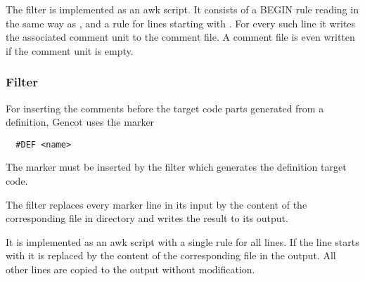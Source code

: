 The filter is implemented as an awk script. It consists of a 
BEGIN rule reading  in the same way as , and a rule for lines starting with 
. For every such line it writes the associated comment unit to the comment file. A comment
file is even written if the comment unit is empty.

\subsubsection{Filter }

For inserting the comments before the target code parts generated from a definition, Gencot uses the marker
\begin{verbatim}
  #DEF <name>
\end{verbatim}
The marker must be inserted by the filter which generates the definition target code.

The filter  replaces every marker line in its input by the content of the corresponding
 file in directory  and writes the result to its output.

It is implemented as an awk script with a single rule for all lines. If the line starts with  it is
replaced by the content of the corresponding file in the output. All other lines are copied to the output without 
modification.
